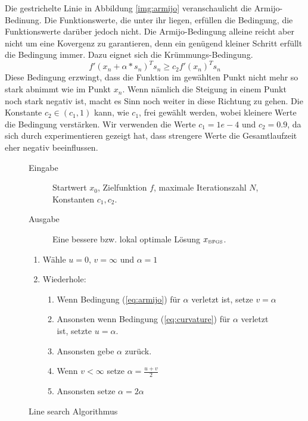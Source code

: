 \documentclass[runningheads,a4paper]{llncs}
\begin{document}
Die gestrichelte Linie in Abbildung \ref{img:armijo} veranschaulicht die Armijo-Bedinung. Die Funktionswerte, die unter ihr liegen, erfüllen die Bedingung, die Funktionswerte darüber jedoch nicht. Die Armijo-Bedingung alleine reicht aber nicht um eine Kovergenz zu garantieren, denn ein genügend kleiner Schritt erfüllt die Bedingung immer. Dazu eignet sich die Krümmungs-Bedingung.
\begin{equation}
\label{eq:curvature}
f'(x_n+\alpha*s_n)^T s_n \ge c_2 f'(x_n)^T s_n
\end{equation}
Diese Bedingung erzwingt, dass die Funktion im gewählten Punkt nicht mehr so stark abnimmt wie im Punkt $x_n$. Wenn nämlich die Steigung in einem Punkt noch stark negativ ist, macht es Sinn noch weiter in diese Richtung zu gehen. Die Konstante ${c_2\in (c_1,1)}$ kann, wie $c_1$, frei gewählt werden, wobei kleinere Werte die Bedingung verstärken. Wir verwenden die Werte $c_1 = 1e-4$ und $c_2 = 0.9$, da sich durch experimentieren gezeigt hat, dass strengere Werte die Gesamtlaufzeit eher negativ beeinflussen.

\begin{figure}[ht]
 \centering
 \begin{description}
 \item[Eingabe] Startwert $x_0$, Zielfunktion $f$, maximale Iterationszahl $N$, Konstanten $c_1,c_2$.
 \item[Ausgabe] Eine bessere bzw. lokal optimale Lösung $x_{\text{\tiny{BFGS}}}$.
 \end{description}
 \begin{enumerate}
 	\item Wähle $u=0$, $v=\infty$ und $\alpha = 1$
 	\item Wiederhole:
 	\begin{enumerate}
 	\item Wenn Bedingung (\ref{eq:armijo}) für $\alpha$ verletzt ist, setze $v=\alpha$
 	\item Ansonsten wenn Bedingung (\ref{eq:curvature}) für $\alpha$ verletzt ist, setzte $u=\alpha$.
 	\item Ansonsten gebe $\alpha$ zurück.
 	\item Wenn $v < \infty$ setze $\alpha = \frac{u+v}{2}$
 	\item Ansonsten setze $\alpha = 2\alpha$
 	\end{enumerate}
 \end{enumerate}
 \caption{Line search Algorithmus \cite{DBLP:journals/mp/LewisO13}}
 \label{alg:linesearch}
\end{figure}
\end{document}
